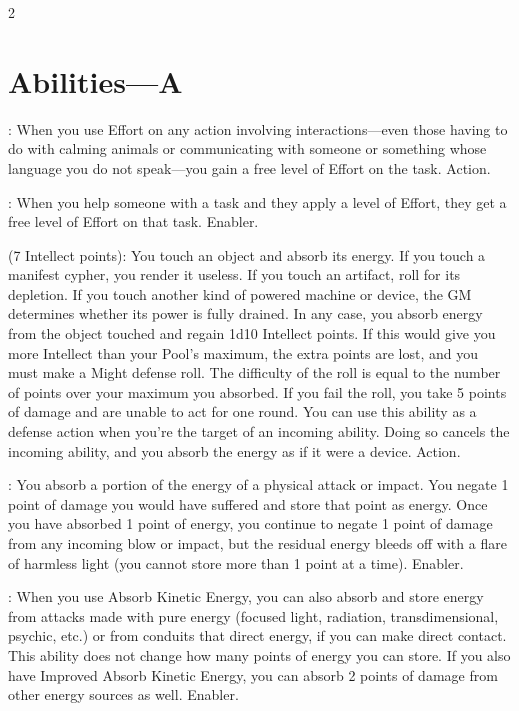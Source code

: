 \begin{multicols}{2}

\section{Abilities—A}

: When you use Effort on any action involving interactions—even those having to do with calming animals or communicating with someone or something whose language you do not speak—you gain a free level of Effort on the task. Action. 

: When you help someone with a task and they apply a level of Effort, they get a free level of Effort on that task. Enabler. 
 
 (7 Intellect points): You touch an object and absorb its energy. If you touch a manifest cypher, you render it useless. If you touch an artifact, roll for its depletion. If you touch another kind of powered machine or device, the GM determines whether its power is fully drained. In any case, you absorb energy from the object touched and regain 1d10 Intellect points. If this would give you more Intellect than your Pool’s maximum, the extra points are lost, and you must make a Might defense roll. The difficulty of the roll is equal to the number of points over your maximum you absorbed. If you fail the roll, you take 5 points of damage and are unable to act for one round. You can use this ability as a defense action when you’re the target of an incoming ability. Doing so cancels the incoming ability, and you absorb the energy as if it were a device. Action. 

: You absorb a portion of the energy of a physical attack or impact. You negate 1 point of damage you would have suffered and store that point as energy. Once you have absorbed 1 point of energy, you continue to negate 1 point of damage from any incoming blow or impact, but the residual energy bleeds off with a flare of harmless light (you cannot store more than 1 point at a time). Enabler. 

: When you use Absorb Kinetic Energy, you can also absorb and store energy from attacks made with pure energy (focused light, radiation, transdimensional, psychic, etc.) or from conduits that direct energy, if you can make direct contact. This ability does not change how many points of energy you can store. If you also have Improved Absorb Kinetic Energy, you can absorb 2 points of damage from other energy sources as well. Enabler. 
 

\end{multicols}
